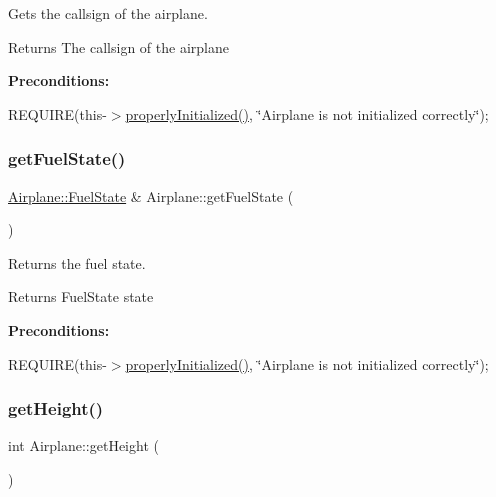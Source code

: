 Gets the callsign of the airplane. 

\begin{DoxyReturn}{Returns}
The callsign of the airplane
\end{DoxyReturn}
{\bfseries Preconditions\+:}
\begin{DoxyItemize}
\item R\+E\+Q\+U\+I\+RE(this-\/$>$\mbox{\hyperlink{class_airplane_a6f80df8f692cc8d67d292c1e9f26d59e}{properly\+Initialized()}}, \char`\"{}\+Airplane is not initialized correctly\char`\"{}); 
\end{DoxyItemize}\mbox{\label{class_airplane_a66070ab8430583b6abacec0bfe82a830}} 
\subsubsection{\texorpdfstring{get\+Fuel\+State()}{getFuelState()}}
{\footnotesize\ttfamily \mbox{\hyperlink{class_airplane_ad17ce69f4dd39704789158c726f5bf45}{Airplane\+::\+Fuel\+State}} \& Airplane\+::get\+Fuel\+State (\begin{DoxyParamCaption}{ }\end{DoxyParamCaption})}



Returns the fuel state. 

\begin{DoxyReturn}{Returns}
Fuel\+State state
\end{DoxyReturn}
{\bfseries Preconditions\+:}
\begin{DoxyItemize}
\item R\+E\+Q\+U\+I\+RE(this-\/$>$\mbox{\hyperlink{class_airplane_a6f80df8f692cc8d67d292c1e9f26d59e}{properly\+Initialized()}}, \char`\"{}\+Airplane is not initialized correctly\char`\"{}); 
\end{DoxyItemize}\mbox{\label{class_airplane_a2e4bec29526f4c1996aaf199c35484b3}} 
\subsubsection{\texorpdfstring{get\+Height()}{getHeight()}}
{\footnotesize\ttfamily int Airplane\+::get\+Height (\begin{DoxyParamCaption}{ }\end{DoxyParamCaption})}



